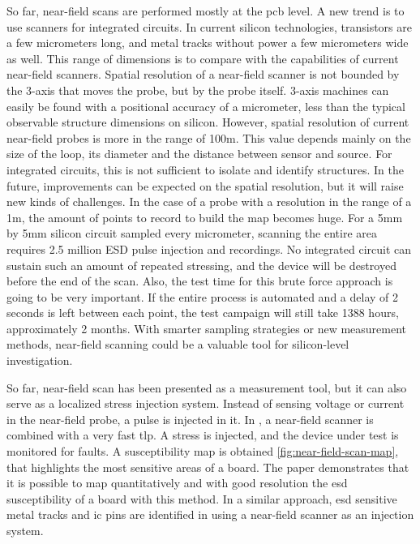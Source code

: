 So far, near-field scans are performed mostly at the \gls{pcb} level.
A new trend is to use scanners for integrated circuits.
In current silicon technologies, transistors are a few micrometers long, and metal tracks without power a few micrometers wide as well.
This range of dimensions is to compare with the capabilities of current near-field scanners.
Spatial resolution of a near-field scanner is not bounded by the 3-axis that moves the probe, but by the probe itself.
3-axis machines can easily be found with a positional accuracy of a micrometer, less than the typical observable structure dimensions on silicon.
However, spatial resolution of current near-field probes is more in the range of 100\textmu{}m.
This value depends mainly on the size of the loop, its diameter and the distance between sensor and source.
For integrated circuits, this is not sufficient to isolate and identify structures.
In the future, improvements can be expected on the spatial resolution, but it will raise new kinds of challenges.
In the case of a probe with a resolution in the range of a 1\textmu{}m, the amount of points to record to build the map becomes huge.
For a 5mm by 5mm silicon circuit sampled every micrometer, scanning the entire area requires 2.5 million ESD pulse injection and recordings.
No integrated circuit can sustain such an amount of repeated stressing, and the device will be destroyed before the end of the scan.
Also, the test time for this brute force approach is going to be very important.
If the entire process is automated and a delay of 2 seconds is left between each point, the test campaign will still take 1388 hours, approximately 2 months.
With smarter sampling strategies or new measurement methods, near-field scanning could be a valuable tool for silicon-level investigation.

So far, near-field scan has been presented as a measurement tool, but it can also serve as a localized stress injection system.
Instead of sensing voltage or current in the near-field probe, a pulse is injected in it.
In \cite{NearFieldInjectionFabrice}, a near-field scanner is combined with a very fast \gls{tlp}.
A stress is injected, and the device under test is monitored for faults.
A susceptibility map is obtained \ref{fig:near-field-scan-map}, that highlights the most sensitive areas of a board.
The paper demonstrates that it is possible to map quantitatively and with good resolution the \gls{esd} susceptibility of a board with this method.
In a similar approach, \gls{esd} sensitive metal tracks and \gls{ic} pins are identified in \cite{NearFieldInjectionBis} using a near-field scanner as an injection system.

